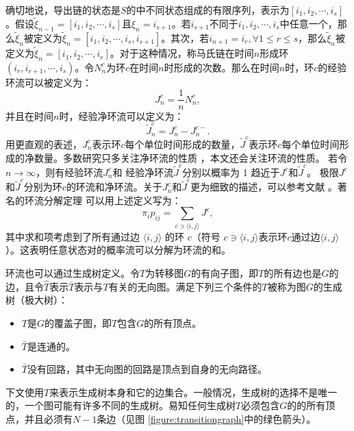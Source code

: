 确切地说，导出链的状态是$S$的中不同状态组成的有限序列，表示为$[i_1,i_2,\cdots,i_s]$。假设$\tilde{\xi}_{n-1}=[i_1,i_2,\cdots,i_s]$且$\xi_n = i_{s+1}$。若$i_{s+1}$不同于$i_1,i_2,\cdots,i_s$中任意一个，那么$\tilde{\xi}_n$被定义为$\tilde{\xi}_n = [i_1,i_2,\cdots,i_s,i_{s+1}]$。其次，若$i_{n+1}=i_r, \forall 1 \le r\le s$，那么$\tilde{\xi}_n$被定义为$\tilde{\xi}_n = [i_1,i_2,\cdots,i_r]$。对于这种情况，称马氏链在时间$n$形成环$(i_r,i_{r+1},\cdots,i_s)$。令$N^c_n$为环$c$在时间$n$时形成的次数。那么在时间$n$时，环$c$的经验环流可以被定义为：
\begin{equation*}
    J_n^c = \frac{1}{n}N^c_n,
\end{equation*}
并且在时间$n$时，经验净环流可以定义为：
\begin{equation*}
    \tilde{J}^c_n = J^c_n-J^{c-}_n.
\end{equation*}
用更直观的表述，$J^c_n$表示环$c$每个单位时间形成的数量，$\tilde{J}^c$表示环$c$每个单位时间形成的净数量。多数研究只多关注净环流的性质 \cite{Schnakenberg1976NetworkTO,andrieux2007fluctuation,andrieux2007network}，本文还会关注环流的性质。
若令$n\rightarrow\infty$，则有经验环流$J^c_n$和 经验净环流$\tilde{J}^c$分别以概率为 1 趋近于$J^c$和$\tilde{J}^c$。
极限$J^c$和$\tilde{J}^c$分别为环$c$的环流和净环流。关于$J^c_n$和$\tilde{J}^c$更为细致的描述，可以参考文献 \cite{jiang2004mathematical}。著名的环流分解定理 \cite{jiang2004mathematical} 可以用上述定义写为：
\begin{equation}\label{decomposition}
    \pi_ip_{ij} = \sum_{c\ni\langle i,j\rangle}J^c,
\end{equation}
其中求和项考虑到了所有通过边 $\langle i, j\rangle$ 的环 $c$（符号 $c \ni \langle i, j\rangle$表示环$c$通过边$\langle i, j\rangle$）。这表明任意状态对的概率流可以分解为环流的和。

环流也可以通过生成树定义\cite{Schnakenberg1976NetworkTO,kalpazidou2007cycle}。令$T$为转移图$G$的有向子图，即$T$的所有边也是$G$的边，且令$\hat{T}$表示$\bar{T}$表示与$T$有关的无向图。满足下列三个条件的$T$被称为图$G$的生成树（极大树）：
\begin{itemize}
    \item $T$是$G$的覆盖子图，即$T$包含$G$的所有顶点。
    \item $\bar{T}$是连通的。
    \item $\bar{T}$没有回路，其中无向图的回路是顶点到自身的无向路径。
\end{itemize}

下文使用$T$来表示生成树本身和它的边集合。一般情况，生成树的选择不是唯一的，一个图可能有许多不同的生成树。易知任何生成树$T$必须包含$G$的的所有顶点，并且必须有$N-1$条边（见图 \ref{figure:transitiongraph}中的绿色箭头）\cite{kalpazidou2007cycle}。

